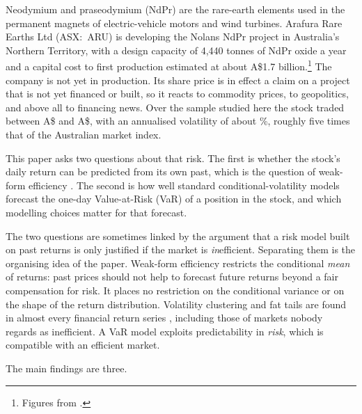 \documentclass[11pt,a4paper]{article}
\begin{document}
Neodymium and praseodymium (NdPr) are the rare-earth elements used in the permanent magnets of electric-vehicle motors and wind turbines. Arafura Rare Earths Ltd (ASX:\ ARU) is developing the Nolans NdPr project in Australia's Northern Territory, with a design capacity of 4,440 tonnes of NdPr oxide a year and a capital cost to first production estimated at about A\$1.7 billion.\footnote{Figures from \citet{arafura2023}.} The company is not yet in production. Its share price is in effect a claim on a project that is not yet financed or built, so it reacts to commodity prices, to geopolitics, and above all to financing news. Over the sample studied here the stock traded between A\$\priceMin{} and A\$\priceMax{}, with an annualised volatility of about \aruAnnVol\%, roughly five times that of the Australian market index.

This paper asks two questions about that risk. The first is whether the stock's daily return can be predicted from its own past, which is the question of weak-form efficiency \citep{fama1970}. The second is how well standard conditional-volatility models forecast the one-day Value-at-Risk (VaR) of a position in the stock, and which modelling choices matter for that forecast.

The two questions are sometimes linked by the argument that a risk model built on past returns is only justified if the market is \emph{in}efficient. Separating them is the organising idea of the paper. Weak-form efficiency restricts the conditional \emph{mean} of returns: past prices should not help to forecast future returns beyond a fair compensation for risk. It places no restriction on the conditional variance or on the shape of the return distribution. Volatility clustering and fat tails are found in almost every financial return series \citep{cont2001}, including those of markets nobody regards as inefficient. A VaR model exploits predictability in \emph{risk}, which is compatible with an efficient market.

The main findings are three.
\end{document}
